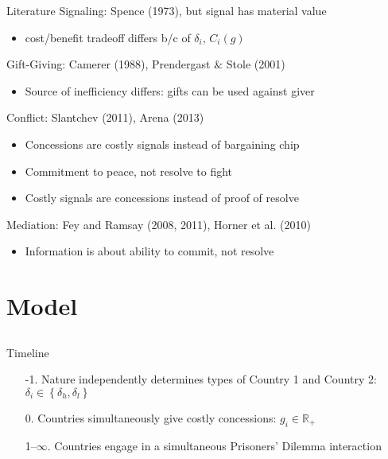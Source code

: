 \documentclass[handout]{beamer}
\newcommand{\de}{\delta}
\begin{document}
\begin{frame}{Literature}
\pause
Signaling: Spence (1973), but signal has material value
\pause
		\begin{itemize}
			\item cost/benefit tradeoff differs b/c of $\de_i$, $C_i(g)$
		\end{itemize} 

\pause
Gift-Giving: Camerer (1988), Prendergast $\&$ Stole (2001)
\pause
		\begin{itemize}
			\item Source of inefficiency differs: gifts can be used against giver
		\end{itemize} 

\pause
Conflict: Slantchev (2011), Arena (2013)
\pause
		\begin{itemize}[<+->]
			\item Concessions are costly signals instead of bargaining chip
			\item Commitment to peace, not resolve to fight
			\item Costly signals are concessions instead of proof of resolve
		\end{itemize} 

\pause
Mediation: Fey and Ramsay (2008, 2011), Horner et al. (2010)
\pause
		\begin{itemize}
			\item Information is about ability to commit, not resolve
		\end{itemize} 
\end{frame}



\section{Model}
\subsection{}
\begin{frame}{Timeline}
\pause
\begin{enumerate}[<+->]
	\item[-1.] Nature independently determines types of Country 1 and Country 2: $\de_i \in \left\{\de_h,\de_l\right\}$
	\item[0.] Countries simultaneously give costly concessions: $g_i \in \mathbb{R}_+$
	\item[1--$\infty$.] Countries engage in a simultaneous Prisoners' Dilemma interaction 
\end{enumerate}

\end{frame}
\end{document}
